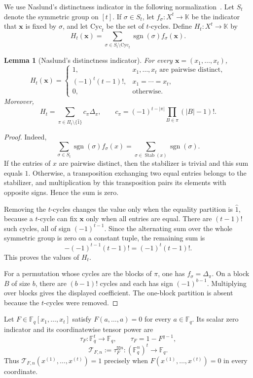 \documentclass[10pt,a4paper]{amsart}
\newtheorem{lemma}[theorem]{Lemma}
\theoremstyle{definition}
\newcommand{\F}{\mathbb F}
\newcommand{\boxt}{\boxtimes}
\newcommand{\1}{\mathbf 1}
\newcommand{\Tau}{\mathcal T}
\begin{document}
We use Naslund's distinctness indicator in the following normalization~\cite[Lemma~15]{NaslundPartition}.  Let $S_t$ denote the symmetric group on $[t]$.  If $\sigma\in S_t$, let $f_\sigma:X^t\to\mathbb K$ be the indicator that $\mathbf x$ is fixed by $\sigma$, and let $\mathrm{Cyc}_t$ be the set of $t$-cycles.  Define $H_t:X^t\to\mathbb K$ by
\[
 H_t(\mathbf x)=
 \sum_{\sigma\in S_t\setminus\mathrm{Cyc}_t}
 \operatorname{sgn}(\sigma)f_\sigma(\mathbf x).
\]

\begin{lemma}[Naslund's distinctness indicator]\label{lem:naslund-indicator}
For every $\mathbf x=(x_1,\ldots,x_t)$,
\[
 H_t(\mathbf x)=
 \begin{cases}
 1,&x_1,\ldots,x_t\text{ are pairwise distinct},\\
 (-1)^t(t-1)!,&x_1=\cdots=x_t,\\
 0,&\text{otherwise}.
 \end{cases}
\]
Moreover,
\[
 H_t=\sum_{\pi\in\Pi_t\setminus\{\widehat1\}}c_\pi\Delta_\pi,
\qquad
 c_\pi=(-1)^{t-|\pi|}\prod_{B\in\pi}(|B|-1)!.
\]
\end{lemma}

\begin{proof}
{Indeed,
\[
 \sum_{\sigma\in S_t}\operatorname{sgn}(\sigma)f_\sigma(x)
 =
 \sum_{\sigma\in\operatorname{Stab}(x)}\operatorname{sgn}(\sigma).
\]
If the entries of \(x\) are pairwise distinct, then the stabilizer is
trivial and this sum equals \(1\). Otherwise, a transposition exchanging
two equal entries belongs to the stabilizer, and multiplication by this
transposition pairs its elements with opposite signs. Hence the sum is
zero. }

Removing the $t$-cycles changes the value only when the equality partition is $\widehat1$, because a $t$-cycle can fix $\mathbf x$ only when all entries are equal.  There are $(t-1)!$ such cycles, all of sign $(-1)^{t-1}$.  Since the alternating sum over the whole symmetric group is zero on a constant tuple, the remaining sum is
\[
 -(-1)^{t-1}(t-1)!=(-1)^t(t-1)!.
\]
This proves the values of $H_t$.

For a permutation whose cycles are the blocks of $\pi$, one has $f_\sigma=\Delta_\pi$.  On a block $B$ of size $b$, there are $(b-1)!$ cycles and each has sign $(-1)^{b-1}$.  Multiplying over blocks gives the displayed coefficient.  The one-block partition is absent because the $t$-cycles were removed.
\end{proof}

Let $F\in\F_q[x_1,\ldots,x_t]$ satisfy $F(a,\ldots,a)=0$ for every $a\in\F_q$.  Its scalar zero indicator and its coordinatewise tensor power are
\[
 \tau_F:\F_q^t\longrightarrow\F_q,
 \qquad
 \tau_F=1-F^{q-1},
\]
\[
 \Tau_{F,n}:=\tau_F^{\boxt n}:(\F_q^n)^t\longrightarrow\F_q.
\]
Thus $\Tau_{F,n}(x^{(1)},\ldots,x^{(t)})=1$ precisely when
$F(x^{(1)},\ldots,x^{(t)})=0$ in every coordinate.
\end{document}
